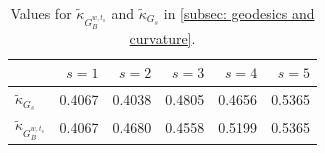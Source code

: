 \begin{table}
\caption{Values for $\widetilde{\kappa}_{G_B^{w,t_s}}$ and $\widetilde{\kappa}_{G_s}$ in \cref{subsec: geodesics and curvature}.}
\label{tab: average OR curvature values}
\begin{tabular}{lrrrrr}
\toprule
 & $s=1$ & $s=2$ & $s=3$ & $s=4$ & $s=5$ \\
\midrule
$\widetilde{\kappa}_{G_s}$ & 0.4067 & 0.4038 & 0.4805 & 0.4656 & 0.5365 \\
$\widetilde{\kappa}_{G_B^{w,t_s}}$ & 0.4067 & 0.4680 & 0.4558 & 0.5199 & 0.5365 \\
\bottomrule
\end{tabular}
\end{table}
